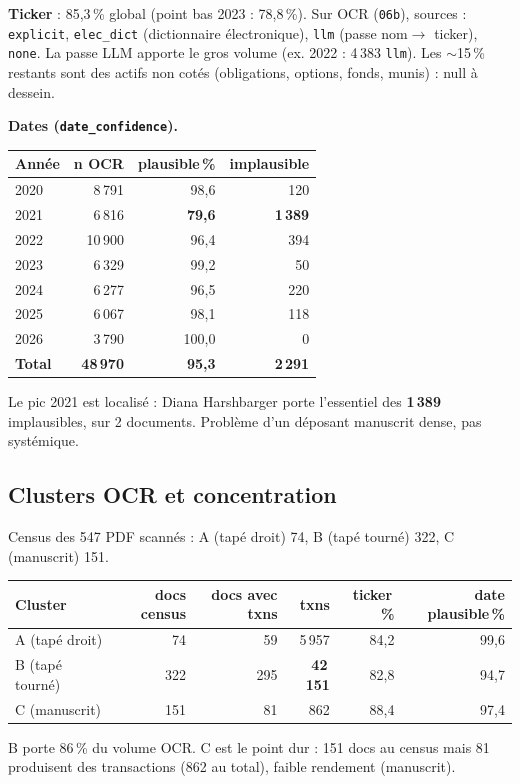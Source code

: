 \documentclass[11pt,a4paper]{article}
\begin{document}
\textbf{Ticker} : 85,3\,\% global (point bas 2023 : 78,8\,\%). Sur OCR (\texttt{06b}), sources :
\texttt{explicit}, \texttt{elec\_dict} (dictionnaire électronique), \texttt{llm} (passe nom$\rightarrow$
ticker), \texttt{none}. La passe LLM apporte le gros volume (ex. 2022 : 4\,383 \texttt{llm}). Les
$\sim$15\,\% restants sont des actifs non cotés (obligations, options, fonds, munis) : null à dessein.

\textbf{Dates (\texttt{date\_confidence}).}
\begin{center}\small
\begin{tabular}{@{}lrrr@{}}
\toprule
\textbf{Année} & \textbf{n OCR} & \textbf{plausible\,\%} & \textbf{implausible} \\
\midrule
2020 & 8\,791 & 98,6 & 120 \\
2021 & 6\,816 & \textbf{79,6} & \textbf{1\,389} \\
2022 & 10\,900 & 96,4 & 394 \\
2023 & 6\,329 & 99,2 & 50 \\
2024 & 6\,277 & 96,5 & 220 \\
2025 & 6\,067 & 98,1 & 118 \\
2026 & 3\,790 & 100,0 & 0 \\
\midrule
\textbf{Total} & \textbf{48\,970} & \textbf{95,3} & \textbf{2\,291} \\
\bottomrule
\end{tabular}
\end{center}
Le pic 2021 est localisé : Diana Harshbarger porte l'essentiel des \textbf{1\,389} implausibles, sur 2
documents. Problème d'un déposant manuscrit dense, pas systémique.

\subsection{Clusters OCR et concentration}
Census des 547 PDF scannés : A (tapé droit) 74, B (tapé tourné) 322, C (manuscrit) 151.
\begin{center}\small
\begin{tabular}{@{}lrrrrr@{}}
\toprule
\textbf{Cluster} & \textbf{docs census} & \textbf{docs avec txns} & \textbf{txns} & \textbf{ticker\,\%} & \textbf{date plausible\,\%} \\
\midrule
A (tapé droit) & 74 & 59 & 5\,957 & 84,2 & 99,6 \\
B (tapé tourné) & 322 & 295 & \textbf{42\,151} & 82,8 & 94,7 \\
C (manuscrit) & 151 & 81 & 862 & 88,4 & 97,4 \\
\bottomrule
\end{tabular}
\end{center}
B porte 86\,\% du volume OCR. C est le point dur : 151 docs au census mais 81 produisent des
transactions (862 au total), faible rendement (manuscrit).
\end{document}
